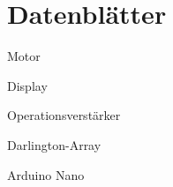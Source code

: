 \documentclass[11pt, titlepage]{report}
\begin{document}
		\section{Datenblätter}
		\label{sec:data}
				\begin{center}
					\vspace*{\fill}
					\centering \Huge Motor
					\vspace*{\fill}
				\end{center}				
			\newpage
			
			\newpage
			\begin{center}
				\vspace*{\fill}
				\centering \Huge Display
				\vspace*{\fill}
			\end{center}				
			\newpage
			
			\newpage
			\begin{center}
				\vspace*{\fill}
				\centering \Huge Operationsverstärker
				\vspace*{\fill}
			\end{center}				
			\newpage
			
			\newpage
			\begin{center}
				\vspace*{\fill}
				\centering \Huge Darlington-Array
				\vspace*{\fill}
			\end{center}				
			\newpage
			
			\newpage
			\begin{center}
				\vspace*{\fill}
				\centering \Huge Arduino Nano
				\vspace*{\fill}
			\end{center}				
			\newpage
			
					
		\newpage
\end{document}
